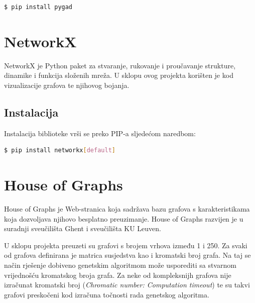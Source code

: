 \documentclass[times, utf8, zavrsni]{fer}
\begin{document}
\begin{lstlisting}[language=bash]
  $ pip install pygad
\end{lstlisting}

\section{NetworkX}
NetworkX je Python paket za stvaranje, rukovanje i proučavanje strukture, dinamike i funkcija složenih mreža. U sklopu ovog projekta korišten je kod vizualizacije grafova te njihovog bojanja.

\subsection{Instalacija}
Instalacija biblioteke vrši se preko PIP-a sljedećom naredbom:

\begin{lstlisting}[language=bash]
  $ pip install networkx[default]
\end{lstlisting}

\section{House of Graphs}
\label{sec:house of graphs}
House of Graphs je Web-stranica koja sadržava bazu grafova s karakteristikama koja dozvoljava njihovo besplatno preuzimanje. House of Graphs razvijen je u suradnji sveučilišta Ghent i sveučilišta KU Leuven.

U sklopu projekta preuzeti su grafovi s brojem vrhova između 1 i 250. Za svaki od grafova definirana je matrica susjedstva kao i kromatski broj grafa. Na taj se način rješenje dobiveno genetskim algoritmom može usporediti sa stvarnom vrijednošću kromatskog broja grafa. Za neke od kompleksnijh grafova nije izračunat kromatski broj (\textit{Chromatic number: Computation timeout}) te su takvi grafovi preskočeni kod izračuna točnosti rada genetskog algoritma.
\end{document}
